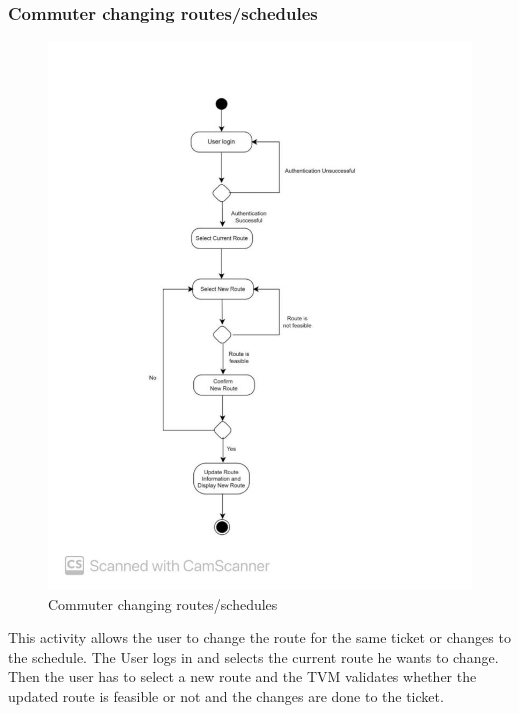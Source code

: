\documentclass{article}
\begin{document}
 \subsubsection{Commuter changing routes/schedules}
     \begin{figure}[h]
        \centering
        \includegraphics[scale=0.4]{customer_changing_route.jpeg}
        \caption{Commuter changing routes/schedules}
        \label{fig:route}
    \end{figure}
    This activity allows the user to change the route for the same ticket or changes to the schedule. The User logs in and selects the current route he wants to change. Then the user has to select a new route and the TVM validates whether the updated route is feasible or not and the changes are done to the ticket.  
    \pagebreak
\end{document}

